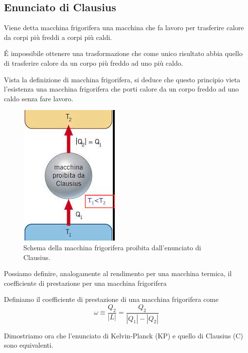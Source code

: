 \documentclass[
10pt, %
a4paper, %
oneside, %
headinclude,footinclude, %
BCOR5mm, %
]{scrartcl}
\begin{document}
\subsection{Enunciato di Clausius}
\begin{definition}
	Viene detta macchina frigorifera una macchina che fa lavoro per trasferire calore da corpi più freddi a corpi più caldi. 
\end{definition}
\begin{definition}
	\'{E} impossibile ottenere una trasformazione che come unico risultato abbia quello di trasferire calore da un corpo più freddo ad uno più caldo. 
\end{definition}
Vista la definizione di macchina frigorifera, si deduce che questo principio vieta l'esistenza una macchina frigorifera che porti calore da un corpo freddo ad uno caldo senza fare lavoro. 
\begin{figure}[h!]
	\centering
	\includegraphics[width=0.3\linewidth]{../images/clausius}
	\caption{Schema della macchina frigorifera proibita dall'enunciato di Clausius.}
	\label{fig:clausius}
\end{figure}
\FloatBarrier
Possiamo definire, analogamente al rendimento per una macchina termica, il coefficiente di prestazione per una macchina frigorifera
\begin{definition}
	Definiamo il coefficiente di prestazione di una macchina frigorifera come \[\omega \equiv \frac{Q_2}{|L|} = \frac{Q_2}{|Q_1|-|Q_2|}\]
\end{definition}
Dimostriamo ora che l'enunciato di Kelvin-Planck (KP) e quello di Clausius (C) sono equivalenti.
\end{document}
